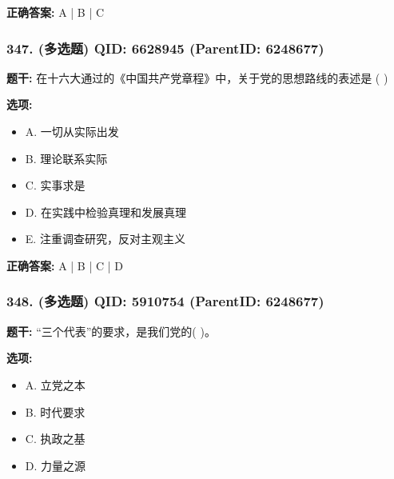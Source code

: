 \documentclass[12pt,UTF8]{ctexart}
\begin{document}
\textbf{正确答案:}
A | B | C

\vspace{0.3em}\hrulefill\vspace{0.7em}

\subsubsection*{347. (多选题) \small QID: 6628945 (ParentID: 6248677)}

\textbf{题干:}
在十六大通过的《中国共产党章程》中，关于党的思想路线的表述是  ( )



\textbf{选项:}
\begin{itemize}[leftmargin=*]

  \item A. 一切从实际出发

  \item B. 理论联系实际

  \item C. 实事求是

  \item D. 在实践中检验真理和发展真理

  \item E. 注重调查研究，反对主观主义

\end{itemize}

\textbf{正确答案:}
A | B | C | D

\vspace{0.3em}\hrulefill\vspace{0.7em}

\subsubsection*{348. (多选题) \small QID: 5910754 (ParentID: 6248677)}

\textbf{题干:}
“三个代表”的要求，是我们党的( )。



\textbf{选项:}
\begin{itemize}[leftmargin=*]

  \item A. 立党之本

  \item B. 时代要求

  \item C. 执政之基

  \item D. 力量之源

\end{itemize}
\end{document}
